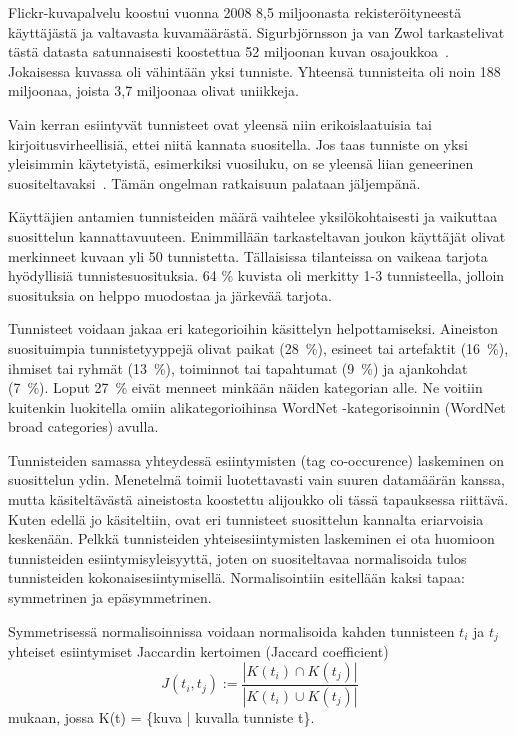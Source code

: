 \documentclass[12pt,finnish]{tktltiki2}
\theoremstyle{definition}
\theoremstyle{remark}
\begin{document}
Flickr-kuvapalvelu koostui vuonna 2008 8,5 miljoonasta rekisteröityneestä käyttäjästä ja valtavasta kuvamäärästä. Sigurbjörnsson ja van Zwol tarkastelivat tästä datasta satunnaisesti koostettua 52 miljoonan kuvan osajoukkoa~\cite{Sigurbjornsson:2008:FTR:1367497.1367542}. Jokaisessa kuvassa oli vähintään yksi tunniste. Yhteensä tunnisteita oli noin 188 miljoonaa, joista 3,7 miljoonaa olivat uniikkeja.

	Vain kerran esiintyvät tunnisteet ovat yleensä niin erikoislaatuisia tai kirjoitusvirheellisiä, ettei niitä kannata suositella. Jos taas tunniste on yksi yleisimmin käytetyistä, esimerkiksi vuosiluku, on se yleensä liian geneerinen suositeltavaksi~\cite{Sigurbjornsson:2008:FTR:1367497.1367542}. Tämän ongelman ratkaisuun palataan jäljempänä.
	
Käyttäjien antamien tunnisteiden määrä vaihtelee yksilökohtaisesti ja vaikuttaa suosittelun kannattavuuteen. Enimmillään tarkasteltavan joukon käyttäjät olivat merkinneet kuvaan yli 50 tunnistetta. Tällaisissa tilanteissa on vaikeaa tarjota hyödyllisiä tunnistesuosituksia. 64 \% kuvista oli merkitty 1-3 tunnisteella, jolloin suosituksia on helppo muodostaa ja järkevää tarjota.

Tunnisteet voidaan jakaa eri kategorioihin käsittelyn helpottamiseksi. Aineiston suosituimpia tunnistetyyppejä olivat paikat (28~\%), esineet tai artefaktit (16~\%), ihmiset tai ryhmät (13~\%), toiminnot tai tapahtumat (9~\%) ja ajankohdat (7~\%). Loput 27~\% eivät menneet minkään näiden kategorian alle. Ne voitiin kuitenkin luokitella omiin alikategorioihinsa WordNet -kategorisoinnin (WordNet broad categories) avulla.

Tunnisteiden samassa yhteydessä esiintymisten (tag co-occurence) laskeminen on suosittelun ydin. Menetelmä toimii luotettavasti vain suuren datamäärän kanssa, mutta käsiteltävästä aineistosta koostettu alijoukko oli tässä tapauksessa riittävä. Kuten edellä jo käsiteltiin, ovat eri tunnisteet suosittelun kannalta eriarvoisia keskenään. Pelkkä tunnisteiden yhteisesiintymisten laskeminen ei ota huomioon tunnisteiden esiintymisyleisyyttä, joten on suositeltavaa normalisoida tulos tunnisteiden kokonaisesiintymisellä. Normalisointiin esitellään kaksi tapaa: symmetrinen ja epäsymmetrinen.

Symmetrisessä normalisoinnissa voidaan normalisoida kahden tunnisteen $t_{i}$ ja $t_{j}$ yhteiset esiintymiset Jaccardin kertoimen (Jaccard coefficient)
\begin{displaymath}
J (t_{i}, t_{j}):= \frac{|K(t_{i}) \cap K(t_{j})|} {|K(t_{i}) \cup K(t_{j})|}
\end{displaymath}
mukaan, jossa K(t) = \{kuva | kuvalla tunniste t\}.
\end{document}
